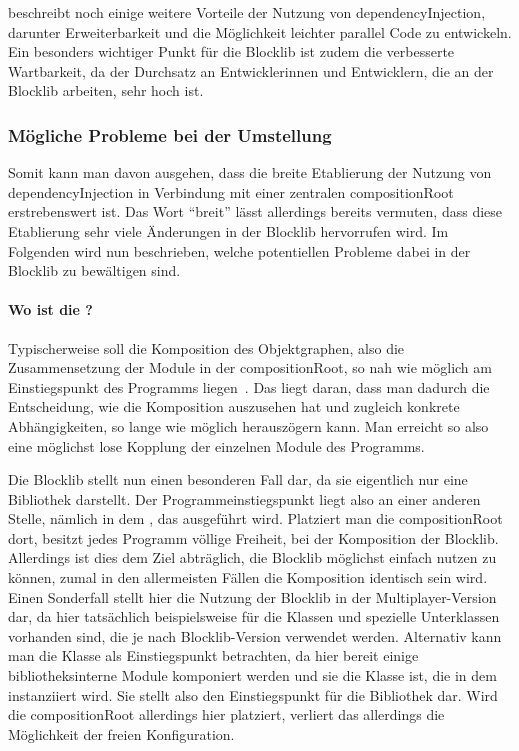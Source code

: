 \textcite[S.~15~ff.]{Seemann2012} beschreibt noch einige weitere Vorteile der Nutzung von \gls{dependencyInjection}, darunter Erweiterbarkeit und die Möglichkeit leichter parallel Code zu entwickeln. Ein besonders wichtiger Punkt für die Blocklib ist zudem die verbesserte Wartbarkeit, da der Durchsatz an Entwicklerinnen und Entwicklern, die an der Blocklib arbeiten, sehr hoch ist.

\subsubsection{Mögliche Probleme bei der Umstellung}

Somit kann man davon ausgehen, dass die breite Etablierung der Nutzung von \gls{dependencyInjection} in Verbindung mit einer zentralen \gls{compositionRoot} erstrebenswert ist. Das Wort \enquote{breit} lässt allerdings bereits vermuten, dass diese Etablierung sehr viele Änderungen in der Blocklib hervorrufen wird. Im Folgenden wird nun beschrieben, welche potentiellen Probleme dabei in der Blocklib zu bewältigen sind.

\paragraph{Wo ist die ?}
Typischerweise soll die Komposition des Objektgraphen, also die Zusammensetzung der Module in der \gls{compositionRoot}, so nah wie möglich am Einstiegspunkt des Programms liegen~\cite[S.~232~ff.]{Martin17}\cite[S.~76~f.]{Seemann2012}. Das liegt daran, dass man dadurch die Entscheidung, wie die Komposition auszusehen hat und zugleich konkrete Abhängigkeiten, so lange wie möglich herauszögern kann. Man erreicht so also eine möglichst lose Kopplung der einzelnen Module des Programms.

Die Blocklib stellt nun einen besonderen Fall dar, da sie eigentlich nur eine Bibliothek darstellt. Der Programmeinstiegspunkt liegt also an einer anderen Stelle, nämlich in dem , das ausgeführt wird. Platziert man die \gls{compositionRoot} dort, besitzt jedes Programm völlige Freiheit, bei der Komposition der Blocklib. Allerdings ist dies dem Ziel abträglich, die Blocklib möglichst einfach nutzen zu können, zumal in den allermeisten Fällen die Komposition identisch sein wird. Einen Sonderfall stellt hier die Nutzung der Blocklib in der Multiplayer-Version dar, da hier tatsächlich beispielsweise für die Klassen  und  spezielle Unterklassen vorhanden sind, die je nach Blocklib-Version verwendet werden. Alternativ kann man die Klasse  als Einstiegspunkt betrachten, da hier bereit einige bibliotheksinterne Module komponiert werden und sie die Klasse ist, die in dem  instanziiert wird. Sie stellt also den Einstiegspunkt für die Bibliothek dar. Wird die \gls{compositionRoot} allerdings hier platziert, verliert das  allerdings die Möglichkeit der freien Konfiguration.

